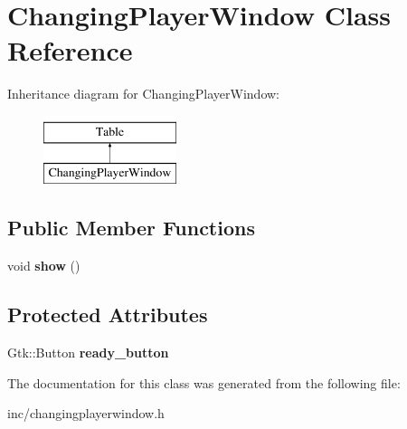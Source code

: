 \hypertarget{classChangingPlayerWindow}{}\section{Changing\+Player\+Window Class Reference}
\label{classChangingPlayerWindow}
Inheritance diagram for Changing\+Player\+Window\+:\begin{figure}[H]
\begin{center}
\leavevmode
\includegraphics[height=2.000000cm]{classChangingPlayerWindow}
\end{center}
\end{figure}
\subsection*{Public Member Functions}
\begin{DoxyCompactItemize}
\item 
\mbox{\label{classChangingPlayerWindow_a8574c3b9d249270b2ccd6b21297c6178}} 
void {\bfseries show} ()
\end{DoxyCompactItemize}
\subsection*{Protected Attributes}
\begin{DoxyCompactItemize}
\item 
\mbox{\label{classChangingPlayerWindow_a19e2f575add97f57e9c74490cd41e08c}} 
Gtk\+::\+Button {\bfseries ready\+\_\+button}
\end{DoxyCompactItemize}


The documentation for this class was generated from the following file\+:\begin{DoxyCompactItemize}
\item 
inc/changingplayerwindow.\+h\end{DoxyCompactItemize}
